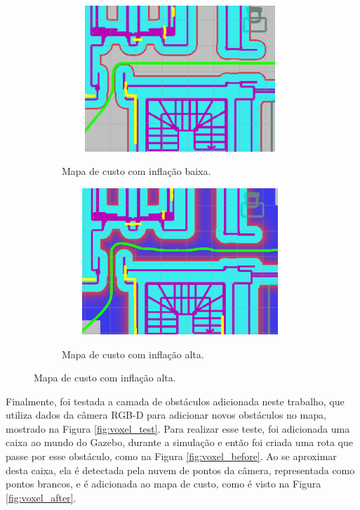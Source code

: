 \documentclass[repeatfields,xlists,xpacks,oneside,yearsonly]{ufrgscca}
\begin{document}
\begin{figure}[h]
    \caption{Trajetórias criadas com diferentes configurações da camada de inflação}
    \begin{subfigure}{0.5\linewidth}
        {
            \centering
            \caption{Mapa de custo com inflação baixa.}
            \label{fig:inflation_low}
            \includegraphics[width=0.98\textwidth, height=5.5cm]{costmap_not_inflated.png}\\
        }
    \end{subfigure}
    \begin{subfigure}{0.5\linewidth}
        {
            \centering
            \caption{Mapa de custo com inflação alta.}
            \label{fig:inflation_high}
            \includegraphics[width=0.98\textwidth, height=5.5cm]{costmap_inflated.png}\\
        }
    \end{subfigure}
\end{figure}

Finalmente, foi testada a camada de obstáculos adicionada neste
trabalho, que utiliza dados da câmera RGB-D para adicionar novos
obstáculos no mapa, mostrado na Figura \ref{fig:voxel_test}. Para
realizar esse teste, foi adicionada uma caixa ao mundo do Gazebo,
durante a simulação e então foi criada uma rota que passe por esse
obstáculo, como na Figura \ref{fig:voxel_before}. Ao se aproximar
desta caixa, ela é detectada pela nuvem de pontos da câmera,
representada como pontos brancos, e é adicionada ao mapa de custo,
como é visto na Figura \ref{fig:voxel_after}.
\end{document}
